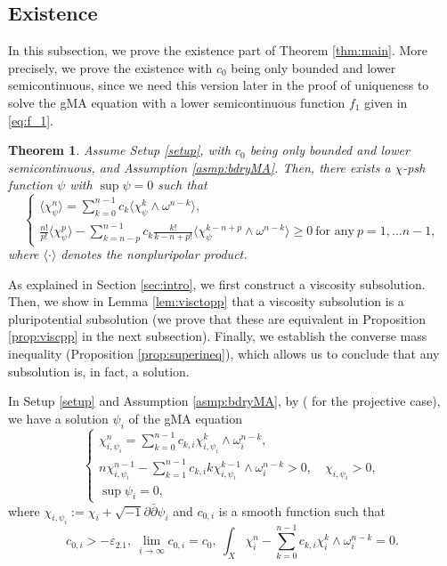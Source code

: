 \documentclass[10pt,a4paper]{amsart}
\numberwithin{equation}{section}
\newtheorem{thm}[equation]{Theorem}
\newcommand{\delb}{\sqrt{-1}\partial\bar{\partial}}
\begin{document}
\subsection{Existence}\label{sec:existence}
In this subsection, we prove the existence part of Theorem \ref{thm:main}. More precisely, we prove the existence with $c_0$ being only bounded and lower semicontinuous, since we need this version later in the proof of uniqueness to solve the gMA equation with a lower semicontinuous function $f_1$ given in \eqref{eq:f_1}.

\begin{thm}\label{thm:existence}
    Assume Setup \ref{setup}, with $c_0$ being only bounded and lower semicontinuous, and Assumption \ref{asmp:bdryMA}.
    Then, there exists a $\chi$-psh function $\psi$ with $\sup \psi=0$ such that
    \begin{equation}\label{eq:lscgMA}
    \begin{cases}
        \langle\chi_\psi^n\rangle=\sum_{k=0}^{n-1}c_k\langle\chi_\psi^k\wedge\omega^{n-k}\rangle,
        \\
        \frac{n!}{p!}\langle\chi_\psi^p\rangle-\sum_{k=n-p}^{n-1}c_k\frac{k!}{k-n+p!}\langle\chi_\psi^{k-n+p}\wedge\omega^{n-k}\rangle\ge0 \ \text{for any} \ p=1,\dots n-1, 
    \end{cases}
    \end{equation}
    where $\langle\cdot\rangle$ denotes the nonpluripolar product.
\end{thm}

As explained in Section \ref{sec:intro}, we first construct a viscosity subsolution. 
Then, we show in Lemma \ref{lem:visctopp} that a viscosity subsolution is a pluripotential subsolution (we prove that these are equivalent in Proposition \ref{prop:viscpp} in the next subsection). Finally, we establish the converse mass inequality (Proposition \ref{prop:superineq}), which allows us to conclude that any subsolution is, in fact, a solution.

In Setup \ref{setup} and Assumption \ref{asmp:bdryMA}, by \cite{FM} (\cite{Datar-Pingali} for the projective case), 
we have a solution $\psi_i$ of the gMA equation
\begin{equation}\label{eq:appgMA}
    \begin{cases}
        \chi^n_{i,\psi_i}=\sum_{k=0}^{n-1}c_{k,i}\chi_{i,\psi_i}^k \wedge\omega_i^{n-k},\\
        n\chi_{i,\psi_i}^{n-1}-\sum_{k=1}^{n-1}c_{k,i} k\chi^{k-1}_{i,\psi_i}\wedge\omega_i^{n-k}>0 ,\quad \chi_{i,\psi_i}>0,\\
        \sup \psi_i=0,
    \end{cases}
    \end{equation}
    where $\chi_{i,\psi_i}:=\chi_i+\delb\psi_i$ and $c_{0,i}$ is a smooth function such that 
    \begin{equation}\label{eq:topnum}
        c_{0,i}>-\varepsilon_{2.1},\ \lim_{i\to\infty} c_{0,i}=c_0,\ \int_X\chi^n_i-\sum_{k=0}^{n-1}c_{k,i}\chi_i^k \wedge\omega_i^{n-k}=0.
    \end{equation}
\end{document}
